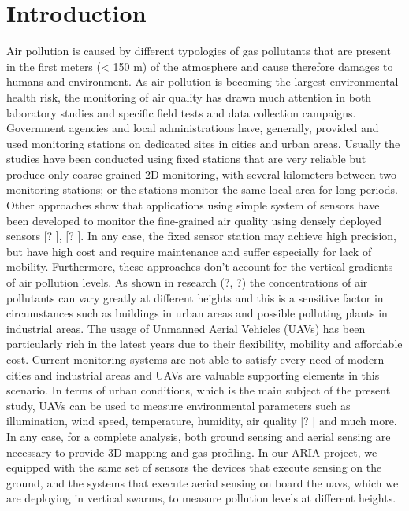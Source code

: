 \chapter{Introduction}
Air pollution is caused by different typologies of gas pollutants that are present in the first meters (< 150 m) of the atmosphere and cause therefore damages to humans and environment. As air pollution is becoming the largest environmental health risk, the monitoring of air quality has drawn much attention in both laboratory studies and specific field tests and data collection campaigns. Government agencies and local administrations have, generally, provided and used monitoring stations on dedicated sites in cities and urban areas. Usually the studies have been conducted using fixed stations that are very reliable but produce only coarse-grained 2D monitoring, with several kilometers between two monitoring stations; or the stations monitor the same local area for long periods.
Other approaches show that applications using simple system of sensors have been developed to monitor the fine-grained air quality using densely deployed sensors [? ], [? ]. In any case, the fixed sensor station may achieve high precision, but have high cost and require maintenance and suffer especially for lack of mobility.
Furthermore, these approaches don't account for the vertical gradients of air pollution levels. As shown in research (?, ?) the concentrations of air pollutants can vary greatly at different heights and this is a sensitive factor in circumstances such as buildings in urban areas and possible polluting plants in industrial areas.
The usage of Unmanned Aerial Vehicles (UAVs) has been particularly rich in the latest years due to their flexibility, mobility and affordable cost. Current monitoring systems are not able to satisfy every need of modern cities and industrial areas and UAVs are valuable supporting elements in this scenario.
In terms of urban conditions, which is the main subject of the present study, UAVs can be used to measure environmental parameters such as illumination, wind speed, temperature, humidity, air quality [? ] and much more. In any case, for a complete analysis, both ground sensing and aerial sensing are necessary to provide 3D mapping and gas profiling. In our ARIA project, we equipped with the same set of sensors the devices that execute sensing on the ground, and the systems that execute aerial sensing on board the \gls{uavs}, which we are deploying in vertical swarms, to measure pollution levels at different heights.
